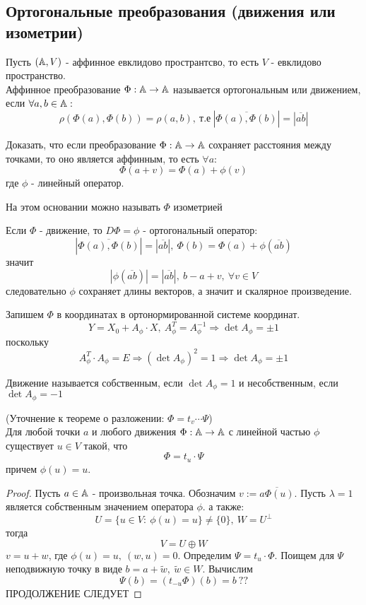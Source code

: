 \subsection*{Ортогональные преобразования (движения или изометрии)}
\begin{definition}
    Пусть $(\mathbb{A},V)$ - аффинное евклидово пространтсво, то есть $V$ - евклидово пространство.\\
    Аффинное преобразование $\Phi: \mathbb{A}\to \mathbb{A}$ называется ортогональным или движением, если $\forall a,b\in \mathbb{A}:$
    \[\rho(\Phi(a),\Phi(b))=\rho(a,b),\ \text{т.е}\ |\overline{\Phi(a),\Phi(b)}|=|\overline{ab}|\]
\end{definition} 
\begin{exercise}
    Доказать, что если преобразование $\Phi: \mathbb{A}\to \mathbb{A}$ сохраняет расстояния между точками, то оно является аффинным, то есть $\forall a:$
    \[\Phi(a+v)=\Phi(a)+\phi(v)\]
    где $\phi$ - линейный оператор.
\end{exercise}
На этом основании можно называть $\Phi$ изометрией
\begin{remark}
    Если $\Phi$ - движение, то $D\Phi=\phi$ - ортогональный оператор:
    \[|\overline{\Phi(a),\Phi(b)}|=|\overline{ab}|,\ \Phi(b)=\Phi(a)+\phi(\overline{ab})\]
    значит
    \[|\phi(\overline{ab})|=|\overline{ab}|,\ b-a+v,\ \forall v\in V\]
    следовательно $\phi$ сохраняет длины векторов, а значит и скалярное произведение.
\end{remark}
Запишем $\Phi$ в координатах в ортонормированной системе координат.
\[Y=X_0+A_{\phi}\cdot X,\ A_{\phi}^T=A_{\phi}^{-1} \Longrightarrow \det{A_{\phi}}=\pm 1\]
поскольку
\[A_{\phi}^T\cdot A_{\phi}=E \Longrightarrow (\det{A_{\phi}})^2=1 \Longrightarrow \det{A_{\phi}}=\pm 1\]
\begin{definition}
    Движение называется собственным, если $\det{A_{\phi}}=1$ и несобственным, если $\det{A_{\phi}}=-1$
\end{definition} 
\begin{remark}
    (Уточнение к теореме о разложении: $\Phi=t_v\cdots\Psi$)\\
    Для любой точки $a$ и любого движения $\Phi:\mathbb{A}\to \mathbb{A}$ с линейной частью $\phi$ существует $u\in V$ такой, что
    \[\Phi=t_u\cdot \Psi\]
    причем $\phi(u)=u$.
\end{remark}
\begin{proof}
    Пусть $a\in \mathbb{A}$ - произвольная точка. Обозначим $v:=\overline{a\Phi(u)}$. Пусть $\lambda=1$ является собственным значением оператора $\phi$. а также:
    \[U=\{u\in V:\ \phi(u)=u\}\ne \{0\},\ W=U^{\perp}\]
    тогда
    \[V=U\oplus W\]
    $v=u+w$, где $\phi(u)=u,\ (w,u)=0$. Определим $\Psi=t_u\cdot \Phi$. Поищем для $\Psi$ неподвижную точку в виде $b=a+\widetilde{w},\ \widetilde{w}\in W$. Вычислим 
    \[\Psi(b)=(t_{-u}\Phi)(b)=b\ ??\]
    ПРОДОЛЖЕНИЕ СЛЕДУЕТ
\end{proof}